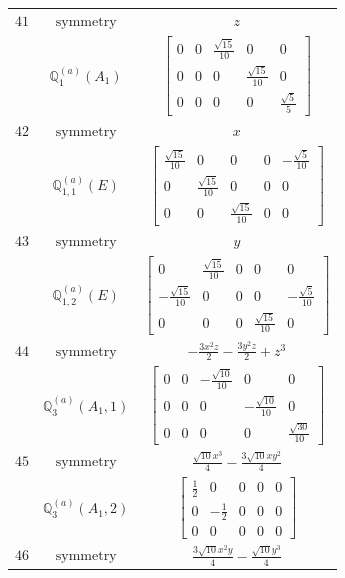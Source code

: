 \documentclass[fleqn,8pt,landscape]{jsarticle}
\begin{document}
\begin{longtable}{ccc}
$ 41 $ & $ \text{symmetry} $ & $ z $ \\
$  $ & $ \mathbb{Q}_{1}^{(a)}(A_{1}) $ & $ \begin{bmatrix} 0 & 0 & \frac{\sqrt{15}}{10} & 0 & 0 \\ 0 & 0 & 0 & \frac{\sqrt{15}}{10} & 0 \\ 0 & 0 & 0 & 0 & \frac{\sqrt{5}}{5} \end{bmatrix} $ \\ \hline
$ 42 $ & $ \text{symmetry} $ & $ x $ \\
$  $ & $ \mathbb{Q}_{1,1}^{(a)}(E) $ & $ \begin{bmatrix} \frac{\sqrt{15}}{10} & 0 & 0 & 0 & - \frac{\sqrt{5}}{10} \\ 0 & \frac{\sqrt{15}}{10} & 0 & 0 & 0 \\ 0 & 0 & \frac{\sqrt{15}}{10} & 0 & 0 \end{bmatrix} $ \\ \hline
$ 43 $ & $ \text{symmetry} $ & $ y $ \\
$  $ & $ \mathbb{Q}_{1,2}^{(a)}(E) $ & $ \begin{bmatrix} 0 & \frac{\sqrt{15}}{10} & 0 & 0 & 0 \\ - \frac{\sqrt{15}}{10} & 0 & 0 & 0 & - \frac{\sqrt{5}}{10} \\ 0 & 0 & 0 & \frac{\sqrt{15}}{10} & 0 \end{bmatrix} $ \\ \hline
$ 44 $ & $ \text{symmetry} $ & $ - \frac{3 x^{2} z}{2} - \frac{3 y^{2} z}{2} + z^{3} $ \\
$  $ & $ \mathbb{Q}_{3}^{(a)}(A_{1},1) $ & $ \begin{bmatrix} 0 & 0 & - \frac{\sqrt{10}}{10} & 0 & 0 \\ 0 & 0 & 0 & - \frac{\sqrt{10}}{10} & 0 \\ 0 & 0 & 0 & 0 & \frac{\sqrt{30}}{10} \end{bmatrix} $ \\ \hline
$ 45 $ & $ \text{symmetry} $ & $ \frac{\sqrt{10} x^{3}}{4} - \frac{3 \sqrt{10} x y^{2}}{4} $ \\
$  $ & $ \mathbb{Q}_{3}^{(a)}(A_{1},2) $ & $ \begin{bmatrix} \frac{1}{2} & 0 & 0 & 0 & 0 \\ 0 & - \frac{1}{2} & 0 & 0 & 0 \\ 0 & 0 & 0 & 0 & 0 \end{bmatrix} $ \\ \hline
$ 46 $ & $ \text{symmetry} $ & $ \frac{3 \sqrt{10} x^{2} y}{4} - \frac{\sqrt{10} y^{3}}{4} $ \\

\end{longtable}
\end{document}
